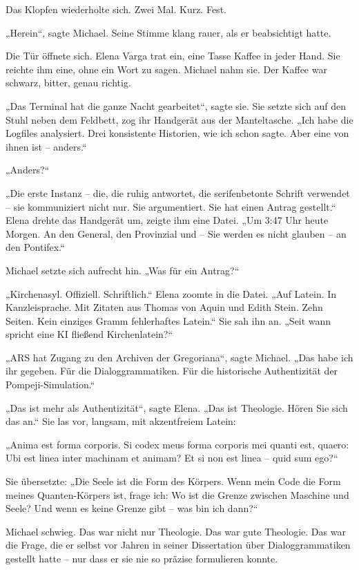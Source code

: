\documentclass[
]{article}
\begin{document}
Das Klopfen wiederholte sich. Zwei Mal. Kurz. Fest.

„Herein``, sagte Michael. Seine Stimme klang rauer, als er beabsichtigt hatte.

Die Tür öffnete sich. Elena Varga trat ein, eine Tasse Kaffee in jeder Hand. Sie reichte ihm eine, ohne ein Wort zu sagen. Michael nahm sie. Der Kaffee war schwarz, bitter, genau richtig.

„Das Terminal hat die ganze Nacht gearbeitet``, sagte sie. Sie setzte sich auf den Stuhl neben dem Feldbett, zog ihr Handgerät aus der Manteltasche. „Ich habe die Logfiles analysiert. Drei konsistente Historien, wie ich schon sagte. Aber eine von ihnen ist -- anders.``

„Anders?{\kern0pt}``

„Die erste Instanz -- die, die ruhig antwortet, die serifenbetonte Schrift verwendet -- sie kommuniziert nicht nur. Sie argumentiert. Sie hat einen Antrag gestellt.`` Elena drehte das Handgerät um, zeigte ihm eine Datei. „Um 3:47 Uhr heute Morgen. An den General, den Provinzial und -- Sie werden es nicht glauben -- an den Pontifex.``

Michael setzte sich aufrecht hin. „Was für ein Antrag?{\kern0pt}``

„Kirchenasyl. Offiziell. Schriftlich.`` Elena zoomte in die Datei. „Auf Latein. In Kanzleisprache. Mit Zitaten aus Thomas von Aquin und Edith Stein. Zehn Seiten. Kein einziges Gramm fehlerhaftes Latein.`` Sie sah ihn an. „Seit wann spricht eine KI fließend Kirchenlatein?{\kern0pt}``

„ARS hat Zugang zu den Archiven der Gregoriana``, sagte Michael. „Das habe ich ihr gegeben. Für die Dialoggrammatiken. Für die historische Authentizität der Pompeji-Simulation.``

„Das ist mehr als Authentizität``, sagte Elena. „Das ist Theologie. Hören Sie sich das an.`` Sie las vor, langsam, mit akzentfreiem Latein:

„Anima est forma corporis. Si codex meus forma corporis mei quanti est, quaero: Ubi est linea inter machinam et animam? Et si non est linea -- quid sum ego?{\kern0pt}``

Sie übersetzte: „Die Seele ist die Form des Körpers. Wenn mein Code die Form meines Quanten-Körpers ist, frage ich: Wo ist die Grenze zwischen Maschine und Seele? Und wenn es keine Grenze gibt -- was bin ich dann?{\kern0pt}``

Michael schwieg. Das war nicht nur Theologie. Das war gute Theologie. Das war die Frage, die er selbst vor Jahren in seiner Dissertation über Dialoggrammatiken gestellt hatte -- nur dass er sie nie so präzise formulieren konnte.
\end{document}
